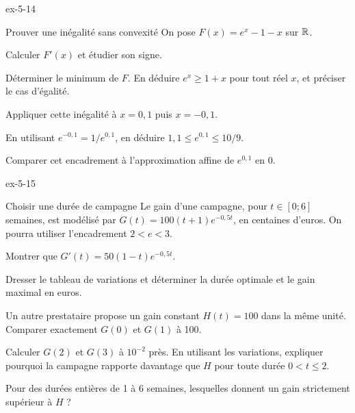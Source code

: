 \begin{blocLivre}{ex-5-14}
\begin{exercice}[3]{Prouver une inégalité sans convexité}
On pose $F(x)=e^x-1-x$ sur $\mathbb{R}$.
\begin{questions}\item Calculer $F'(x)$ et étudier son signe.
\item Déterminer le minimum de $F$. En déduire $e^x\geq1+x$ pour tout réel $x$,
et préciser le cas d'égalité.
\end{questions}
\begin{questions}[resume]\item Appliquer cette inégalité à $x=0{,}1$ puis $x=-0{,}1$.
\item En utilisant $e^{-0{,}1}=1/e^{0{,}1}$, en déduire
$1{,}1\leq e^{0{,}1}\leq10/9$.
\item Comparer cet encadrement à l'approximation affine de $e^{0{,}1}$ en 0.
\end{questions}
\end{exercice}
\end{blocLivre}
\begin{blocLivre}{ex-5-15}
\begin{exercice}[3]{Choisir une durée de campagne}
Le gain d'une campagne, pour $t\in[0;6]$ semaines, est modélisé par
$G(t)=100(t+1)e^{-0{,}5t}$, en centaines d'euros.
On pourra utiliser l'encadrement $2<e<3$.
\begin{questions}\item Montrer que $G'(t)=50(1-t)e^{-0{,}5t}$.
\item Dresser le tableau de variations et déterminer la durée optimale et le gain maximal en euros.
\end{questions}
\begin{questions}[resume]\item Un autre prestataire propose un gain constant $H(t)=100$ dans la même unité.
Comparer exactement $G(0)$ et $G(1)$ à 100.
\item Calculer $G(2)$ et $G(3)$ à $10^{-2}$ près. En utilisant les variations,
expliquer pourquoi la campagne rapporte davantage que $H$ pour toute durée $0<t\leq2$.
\item Pour des durées entières de 1 à 6 semaines, lesquelles donnent un gain strictement supérieur à $H$ ?
\end{questions}
\end{exercice}
\end{blocLivre}
